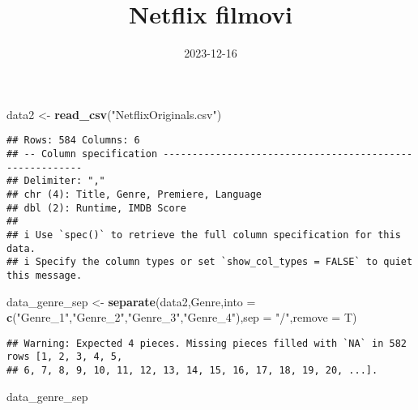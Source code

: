 \documentclass[
]{article}
\title{Netflix filmovi}
\author{}
\date{\vspace{-2.5em}2023-12-16}
\newenvironment{Shaded}{\begin{snugshade}}{\end{snugshade}}
\newcommand{\AttributeTok}[1]{\textcolor[rgb]{0.13,0.29,0.53}{#1}}
\newcommand{\FunctionTok}[1]{\textcolor[rgb]{0.13,0.29,0.53}{\textbf{#1}}}
\newcommand{\NormalTok}[1]{#1}
\newcommand{\OtherTok}[1]{\textcolor[rgb]{0.56,0.35,0.01}{#1}}
\newcommand{\StringTok}[1]{\textcolor[rgb]{0.31,0.60,0.02}{#1}}
\begin{document}
\maketitle

\begin{Shaded}
\begin{Highlighting}[]
\NormalTok{data2 }\OtherTok{\textless{}{-}} \FunctionTok{read\_csv}\NormalTok{(}\StringTok{"NetflixOriginals.csv"}\NormalTok{)}
\end{Highlighting}
\end{Shaded}

\begin{verbatim}
## Rows: 584 Columns: 6
## -- Column specification --------------------------------------------------------
## Delimiter: ","
## chr (4): Title, Genre, Premiere, Language
## dbl (2): Runtime, IMDB Score
## 
## i Use `spec()` to retrieve the full column specification for this data.
## i Specify the column types or set `show_col_types = FALSE` to quiet this message.
\end{verbatim}

\begin{Shaded}
\begin{Highlighting}[]
\NormalTok{data\_genre\_sep }\OtherTok{\textless{}{-}} \FunctionTok{separate}\NormalTok{(data2,Genre,}\AttributeTok{into =} \FunctionTok{c}\NormalTok{(}\StringTok{"Genre\_1"}\NormalTok{,}\StringTok{"Genre\_2"}\NormalTok{,}\StringTok{"Genre\_3"}\NormalTok{,}\StringTok{"Genre\_4"}\NormalTok{),}\AttributeTok{sep =} \StringTok{"/"}\NormalTok{,}\AttributeTok{remove =}\NormalTok{ T)}
\end{Highlighting}
\end{Shaded}

\begin{verbatim}
## Warning: Expected 4 pieces. Missing pieces filled with `NA` in 582 rows [1, 2, 3, 4, 5,
## 6, 7, 8, 9, 10, 11, 12, 13, 14, 15, 16, 17, 18, 19, 20, ...].
\end{verbatim}

\begin{Shaded}
\begin{Highlighting}[]
\NormalTok{data\_genre\_sep}
\end{Highlighting}
\end{Shaded}
\end{document}
